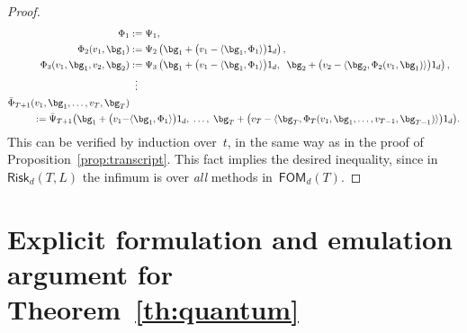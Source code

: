 \documentclass[11pt]{article}
\numberwithin{equation}{section}
\theoremstyle{remark}
\newcommand{\ones}{\mathsf{1}_d}
\newcommand{\FOM}{\textsf{FOM}}
\newcommand{\Risk}{\mathsf{Risk}}
\newcommand{\1}{\mathbf{1}}
\newcommand{\bnabla}{\nabla}
\begin{document}
\begin{proof}
\[\begin{aligned}
\Phi_1 &:= \Psi_1, \\
\Phi_2(v_1, \bg_1) 
&:= \Psi_2 \left(\bg_1 + \big(v_1 -\langle \bg_1,  \Phi_1 \rangle \big) \ones \right), \\
\Phi_3(v_1,\bg_1, v_2, \bg_2) 
&:= \Psi_3 
		\left(
			\bg_1 + \big(v_1 -\langle \bg_1,  \Phi_1 \rangle \big) \ones,  \;\;
			\bg_2 + \big(v_2 -\langle \bg_2,  \Phi_2(v_1,\bg_1) \rangle \big) \ones
		\right), \\
&\;\;\vdots \vspace{-0.1cm} \\ \vspace{-0.1cm}
\bar\Phi_{T+1}(v_1,\bg_1, \dots, v_T, \bg_T) \\
:= \bar\Psi_{T+1} 
		\big(
		\bg_1 + \big(v_1 - &\langle \bg_1, \Phi_1 \rangle \big) \ones, \;\dots,\;
		\bg_T + \big(v_T -\langle \bg_T,  \Phi_T(v_1,\bg_1, \dots, v_{T-1},\bg_{T-1}) \rangle \big) \ones
		\big).
\end{aligned}
\]
This can be verified by induction over~$t$, in the same way as in the proof of Proposition~\ref{prop:transcript}.
This fact implies the desired inequality, since in~$\Risk_{d}(T,L)$ the infimum is over {\em all} methods in~$\FOM_d(T)$. 
\end{proof}
\section{Explicit formulation and emulation argument for Theorem~\ref{th:quantum}}
\label{app:quantum-proof}
\end{document}
